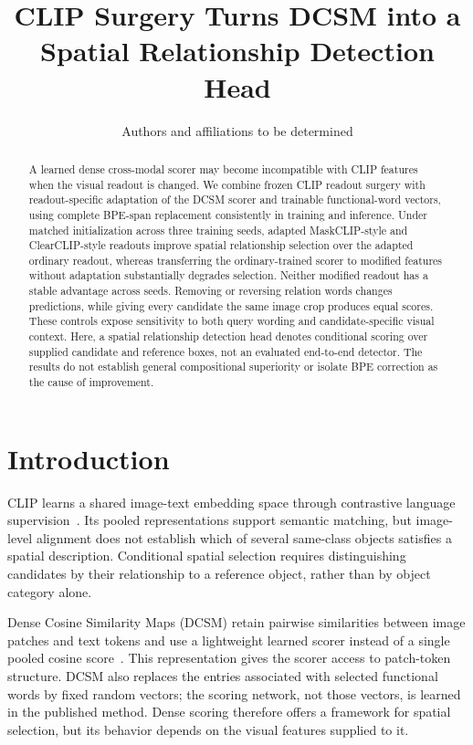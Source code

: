\documentclass[10pt,twocolumn,letterpaper]{article}
\title{CLIP Surgery Turns DCSM into a Spatial Relationship Detection Head}
\author{Authors and affiliations to be determined}
\date{}
\begin{document}
\maketitle
\begin{abstract}
A learned dense cross-modal scorer may become incompatible with CLIP features when the visual readout is changed. We combine frozen CLIP readout surgery with readout-specific adaptation of the DCSM scorer and trainable functional-word vectors, using complete BPE-span replacement consistently in training and inference. Under matched initialization across three training seeds, adapted MaskCLIP-style and ClearCLIP-style readouts improve spatial relationship selection over the adapted ordinary readout, whereas transferring the ordinary-trained scorer to modified features without adaptation substantially degrades selection. Neither modified readout has a stable advantage across seeds. Removing or reversing relation words changes predictions, while giving every candidate the same image crop produces equal scores. These controls expose sensitivity to both query wording and candidate-specific visual context. Here, a spatial relationship detection head denotes conditional scoring over supplied candidate and reference boxes, not an evaluated end-to-end detector. The results do not establish general compositional superiority or isolate BPE correction as the cause of improvement.
\end{abstract}

\section{Introduction}
CLIP learns a shared image-text embedding space through contrastive language supervision~\citep{radford2021clip}. Its pooled representations support semantic matching, but image-level alignment does not establish which of several same-class objects satisfies a spatial description. Conditional spatial selection requires distinguishing candidates by their relationship to a reference object, rather than by object category alone.

Dense Cosine Similarity Maps (DCSM) retain pairwise similarities between image patches and text tokens and use a lightweight learned scorer instead of a single pooled cosine score~\citep{kang2025dcsm}. This representation gives the scorer access to patch-token structure. DCSM also replaces the entries associated with selected functional words by fixed random vectors; the scoring network, not those vectors, is learned in the published method. Dense scoring therefore offers a framework for spatial selection, but its behavior depends on the visual features supplied to it.
\end{document}

